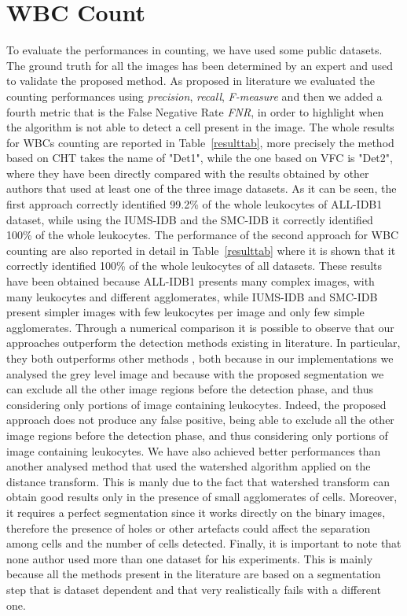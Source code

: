 \documentclass[final,a4paper,12pt,english]{UnicaPhdThesis3}
\begin{document}
\section{WBC Count} %
To evaluate the performances in counting, we have used some public datasets.
The ground truth for all the images has been determined by an expert and used to validate the proposed method. As proposed in literature we evaluated the counting performances using \textit{precision}, \textit{recall}, \textit{F-measure} and then we added a fourth metric that is the False Negative Rate \textit{FNR}, in order to highlight when the algorithm is not able to detect a cell present in the image. The whole results for WBCs counting are reported in Table~\ref{resulttab}, more precisely the method based on CHT takes the name of "Det1", while the one based on VFC is "Det2", where they have been directly compared with the results obtained by other authors that used at least one of the three image datasets. As it can be seen, the first approach correctly identified 99.2\% of the whole leukocytes of ALL-IDB1 dataset, while using the IUMS-IDB and the SMC-IDB it correctly identified 100\% of the whole leukocytes. The performance of the second approach for WBC counting are also reported in detail in Table~\ref{resulttab} where it is shown that it correctly identified 100\% of the whole leukocytes of all datasets. These results have been obtained because ALL-IDB1 presents many complex images, with many leukocytes and different agglomerates, while IUMS-IDB and SMC-IDB present simpler images with few leukocytes per image and only few simple agglomerates. Through a numerical comparison it is possible to observe that our approaches outperform the detection methods existing in literature. In particular, they both outperforms other methods \cite{Mahmood, Alomari}, both because in our implementations we analysed the grey level image and because with the proposed segmentation we can exclude all the other image regions before the detection phase, and thus considering only portions of image containing leukocytes. Indeed, the proposed approach does not produce any false positive, being able to exclude all the other image regions before the detection phase, and thus considering only portions of image containing leukocytes. We have also achieved better performances than another analysed method \cite{Put14b} that used the watershed algorithm applied on the distance transform. This is manly due to the fact that watershed transform can obtain good results only in the presence of small agglomerates of cells. Moreover, it requires a perfect segmentation since it works directly on the binary images, therefore the presence of holes or other artefacts could affect the separation among cells and the number of cells detected. Finally, it is important to note that none author used more than one dataset for his experiments. This is mainly because all the methods present in the literature are based on a segmentation step that is dataset dependent and that very realistically fails with a different one.
\end{document}
